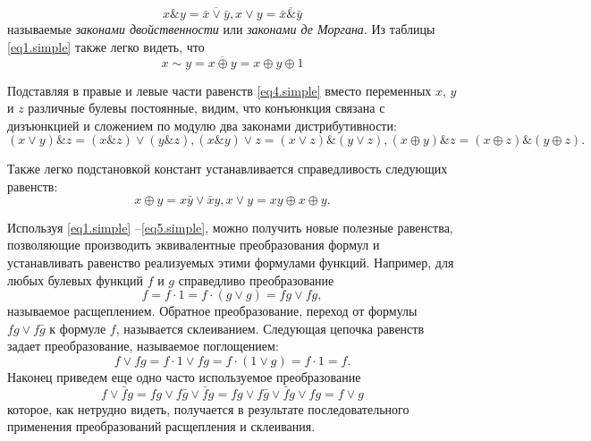 \documentclass[a4paper, 12pt]{article}
\numberwithin{equation}{section}
\begin{document}
	\begin{equation}
  x\&y = \overline{\bar{x} \vee \bar{y}},   x \vee y = \overline{\bar{x}\&\bar{y}} 
\label{eq2.simple}
\end{equation}
называемые \textit{законами двойственности} или \textit{законами де Моргана}. Из таблицы \eqref{eq1.simple} также легко видеть, что
	\begin{equation}
x\sim y = \overline{x \oplus y} = x\oplus y \oplus 1 
\label{eq3.simple}
\end{equation}

Подставляя в правые и левые части равенств \eqref{eq4.simple} вместо переменных $x$, $y$ и $z$ различные булевы постоянные, видим, что конъюнкция связана с дизъюнкцией и сложением по модулю два законами дистрибутивности:
	\begin{equation}
(x \vee y)\&z = (x\&z) \vee (y\&z),
(x\& y) \vee z = (x \vee z)\&(y \vee z) , 
(x \oplus y)\&z = (x \oplus z)\&(y \oplus z). 
\label{eq4.simple}
\end{equation}

Также легко подстановкой констант устанавливается справедливость следующих равенств:
	\begin{equation}
x\oplus y = x\bar{y}\vee\bar{x}y,   x \vee y =  xy\oplus x\oplus y.
\label{eq5.simple}
\end{equation}

Используя \eqref{eq1.simple} --\eqref{eq5.simple}, можно получить новые полезные равенства, позволяющие производить эквивалентные преобразования формул и устанавливать равенство реализуемых этими формулами функций. Например, для любых булевых функций $f$ и $g$ справедливо преобразование
	\begin{equation}
f = f \cdot 1 =f \cdot (g \vee g) = fg \vee fg,
\label{eq6.simple}
\end{equation}
называемое расщеплением. Обратное преобразование, переход от формулы $fg \vee f\bar{g} $ к формуле $f$, называется склеиванием. Следующая цепочка равенств задает преобразование, называемое поглощением:
	\begin{equation}
f \vee fg = f \cdot 1 \vee fg = f \cdot (1 \vee g) = f \cdot 1 = f.
\label{eq7.simple}
\end{equation}
Наконец приведем еще одно часто используемое преобразование
	\begin{equation}
f \vee \bar{f}g = fg \vee f\bar{g} \vee \bar{f}g = fg \vee f\bar{g} \vee \bar{f}g \vee fg = f \vee g
\label{eq8.simple}
\end{equation}
которое, как нетрудно видеть, получается в результате последовательного применения преобразований расщепления и склеивания.
\end{document}
